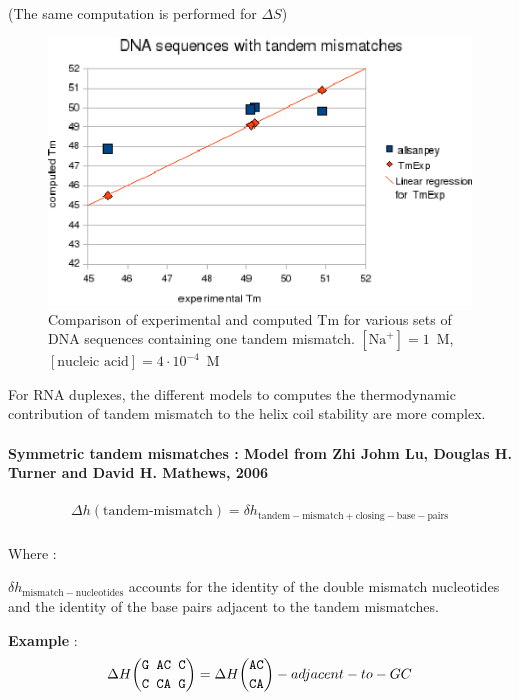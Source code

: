 \documentclass{article}
\begin{document}
       (The same computation is performed for $\Delta S$) 

\begin{figure}[h]
\includegraphics{images/DNATandemMismatch.eps}
\caption{Comparison of experimental and computed Tm for various sets of
 DNA sequences containing one tandem mismatch. $[\mbox{Na}^+] = 1$~M, $[\mbox{nucleic acid}] = 4\cdot{}10^{-4}$~M}
\end{figure}

For RNA duplexes, the different models to computes the thermodynamic contribution of tandem mismatch to the helix coil 
stability are more complex.

\paragraph{Symmetric tandem mismatches : \textbf{Model from Zhi Johm Lu, Douglas H. Turner and David H. Mathews, 2006}}

\begin{multline*}
\Delta h {(\mbox{tandem-mismatch})} = 
\delta{}h_\mathrm{tandem-mismatch+closing-base-pairs} \\
\end{multline*}

Where :

$\delta{}h_\mathrm{mismatch-nucleotides}$ accounts for the identity of the double mismatch nucleotides and the identity of the base pairs
adjacent to the tandem mismatches.

\textbf{Example} :
\begin{multline*}
\Delta H {\mbox{\texttt{G AC C}} \choose \mbox{\texttt{C CA G}}} = 
\Delta H {\mbox{\texttt{AC}} \choose \mbox{\texttt{CA}}} -adjacent-to-GC\\
\end{multline*}
\end{document}
